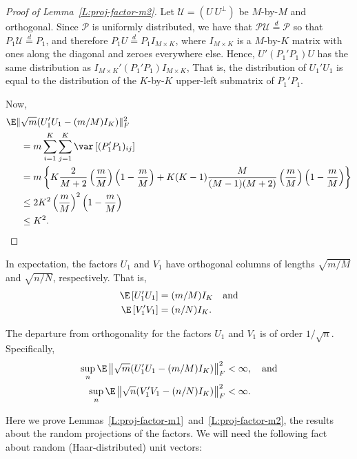 \begin{proof}[Proof of Lemma~\ref{L:proj-factor-m2}]
    Let 
    \(
        \mathcal{U} 
        = \left(U \ U^\perp \right)
    \)
    be $M$-by-$M$ and orthogonal.
    Since $\mathcal{P}$ is uniformly distributed, we have that 
    $\mathcal{P} \mathcal{U} \overset{d}{=} \mathcal{P}$ so that
    $P_1 \mathcal{U} \overset{d}{=} P_1$, and therefore 
    $P_1 U \overset{d}{=} P_1 I_{M\times K}$, where $I_{M \times K}$ is a
    $M$-by-$K$ matrix with ones along the diagonal and zeroes everywhere else.
    Hence, $U' (P_1' P_1) U$ has the same distribution as 
    $I_{M\times K}' (P_1' P_1) I_{M \times K}$, 
    That is, the distribution of $U_1' U_1$ is equal to the 
    distribution of the $K$-by-$K$ upper-left submatrix of $P_1' P_1$.
    
    Now, 
    \begin{align*}
        \E \| &\sqrt{m} (U_1' U_1 - (m/M) I_K) \|_F^2 \\
        &= m \sum_{i=1}^K \sum_{j=1}^{K} \var \left[ (P_1' P_1)_{ij} \right] \\
        &= m \left\{ 
                 K 
                 \frac{2}{M+2}
                 \left(\frac{m}{M}\right) \left( 1 - \frac{m}{M} \right)
                 + 
                 K (K-1)
                 \frac{M}{(M-1)(M+2)}
                 \left(\frac{m}{M}\right) \left( 1 - \frac{m}{M} \right)
             \right\} \\
        &\leq 2 K^2 \left(\frac{m}{M}\right)^2 \left( 1 - \frac{m}{M} \right) \\
        &\leq K^2.
    \end{align*}
\end{proof}



\begin{lemma}\label{L:proj-factor-m1}
    In expectation, the factors $U_1$ and $V_1$ have orthogonal columns of
    lengths $\sqrt{m/M}$ and $\sqrt{n/N}$, respectively.  That is,
    \begin{align*}
        \E \left[ U_1' U_1 \right] &= (m/M) I_K \quad \text{and} \\
        \E \left[ V_1' V_1 \right] &= (n/N) I_K.
    \end{align*}
\end{lemma}

\begin{lemma}\label{L:proj-factor-m2}
    The departure from orthogonality for the factors $U_1$ and $V_1$ is of 
    order $1/\sqrt{n}$.  Specifically,
    \begin{align*}
        \sup_{n} \E \left\| \sqrt{m}( U_1' U_1 - (m/M) I_K) \right\|_F^2 
            &< \infty, \quad \text{and} \\
        \sup_{n} \E \left\| \sqrt{n}( V_1' V_1 - (n/N) I_K ) \right\|_F^2
            &< \infty.
    \end{align*}
\end{lemma}

Here we prove Lemmas~\ref{L:proj-factor-m1}~and~\ref{L:proj-factor-m2}, the
results about the random projections of the factors. We will need the following
fact about random (Haar-distributed) unit vectors:
